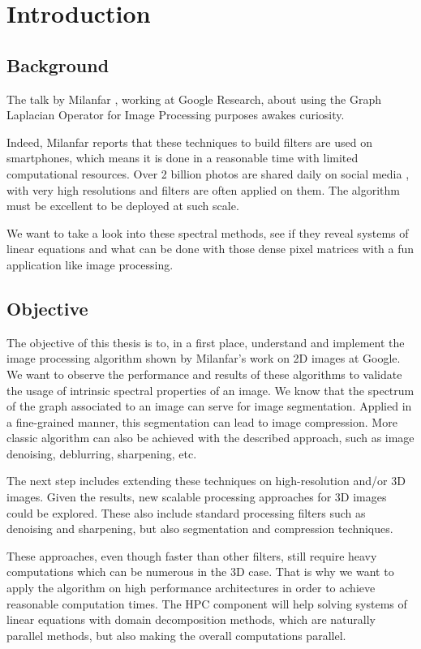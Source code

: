 \chapter{Introduction}

\section{Background}

The talk by Milanfar \cite{siam_slides_2016}, working at Google Research, about using the Graph Laplacian Operator for Image Processing purposes awakes curiosity.

Indeed, Milanfar reports that these techniques to build filters are used on smartphones, which means it is done in a reasonable time with limited computational resources.
Over 2 billion photos are shared daily on social media \cite{siam_slides_2016}, with very high resolutions and filters are often applied on them.
The algorithm must be excellent to be deployed at such scale.

We want to take a look into these spectral methods, see if they reveal systems of linear equations and what can be done with those dense pixel matrices with a fun application like image processing.

\section{Objective}

The objective of this thesis is to, in a first place, understand and implement the image processing algorithm shown by Milanfar's work on 2D images at Google.
We want to observe the performance and results of these algorithms to validate the usage of intrinsic spectral properties of an image.
We know that the spectrum of the graph associated to an image can serve for image segmentation.
Applied in a fine-grained manner, this segmentation can lead to image compression.
More classic algorithm can also be achieved with the described approach, such as image denoising, deblurring, sharpening, etc.

The next step includes extending these techniques on high-resolution and/or 3D images.
Given the results, new scalable processing approaches for 3D images could be explored.
These also include standard processing filters such as denoising and sharpening, but also segmentation and compression techniques.

These approaches, even though faster than other filters, still require heavy computations which can be numerous in the 3D case.
That is why we want to apply the algorithm on high performance architectures in order to achieve reasonable computation times.
The HPC component will help solving systems of linear equations with domain decomposition methods, which are naturally parallel methods, but also making the overall computations parallel.

